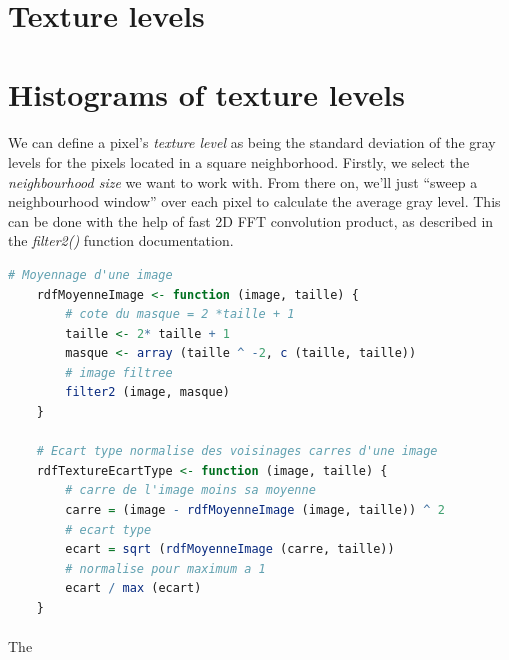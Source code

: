 \section{Texture levels}
\section{Histograms of texture levels}
\paragraph{}
We can define a pixel's \emph{texture level} as being the standard deviation of the gray levels for the pixels located in a square neighborhood.
Firstly, we select the \emph{neighbourhood size} we want to work with.
From there on, we'll just ``sweep a neighbourhood window'' over each pixel to calculate the average gray level.
This can be done with the help of fast 2D FFT convolution product, as described in the \emph{filter2()} function documentation.

\begin{lstlisting}[language=R, caption=Calculating the texture levels]
    # Moyennage d'une image
    rdfMoyenneImage <- function (image, taille) {
        # cote du masque = 2 *taille + 1
        taille <- 2* taille + 1
        masque <- array (taille ^ -2, c (taille, taille))
        # image filtree
        filter2 (image, masque)
    }

    # Ecart type normalise des voisinages carres d'une image
    rdfTextureEcartType <- function (image, taille) {
        # carre de l'image moins sa moyenne
        carre = (image - rdfMoyenneImage (image, taille)) ^ 2
        # ecart type
        ecart = sqrt (rdfMoyenneImage (carre, taille))
        # normalise pour maximum a 1
        ecart / max (ecart)
    }
\end{lstlisting}

\paragraph{}
The 